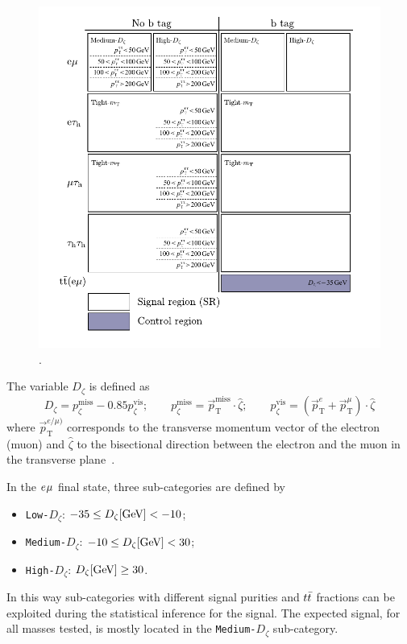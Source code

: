 \begin{figure}[!hbtp]
\centering
    \includegraphics[width=1.0\textwidth]{Figures/low_mass_categories.pdf}
\caption{.}
\label{fig:high_mass_categories}
\end{figure}

The variable $D_\zeta$ is defined as
\begin{equation}
D_\zeta = p_\zeta^\text{miss} - 0.85 p_\zeta^\text{vis};\qquad
p_\zeta^\text{miss} = \vec{p}_\text{T}^\text{miss} \cdot \hat{\zeta};\qquad
p_\zeta^\text{vis} = (\vec{p}_\text{T}^{e} + \vec{p}_\text{T}^{\mu}) \cdot \hat{\zeta}
\label{eq:Dzeta_def}
\end{equation}
where $\vec{p}_\text{T}^{e/\mu)}$ corresponds to the transverse momentum vector of the electron (muon) and $\hat{\zeta}$
to the bisectional direction between the electron and the muon in the transverse plane~\cite{CDFPzeta}.

In the $e_{}\mu_{}$ final state, three sub-categories are defined by
\begin{itemize}
\item \texttt{Low-$D_\zeta$}: $-35 \leq D_\zeta [\text{GeV}] < -10$;
\item \texttt{Medium-$D_\zeta$}: $-10 \leq D_\zeta [\text{GeV}] <  30$;
\item \texttt{High-$D_\zeta$}: $D_\zeta [\text{GeV}] \geq 30$.
\end{itemize}
In this way sub-categories with different signal purities and $t\bar{t}$ fractions can be exploited during the statistical inference for the signal.
The expected signal, for all masses tested, is mostly located in the \texttt{Medium-$D_\zeta$} sub-category.

